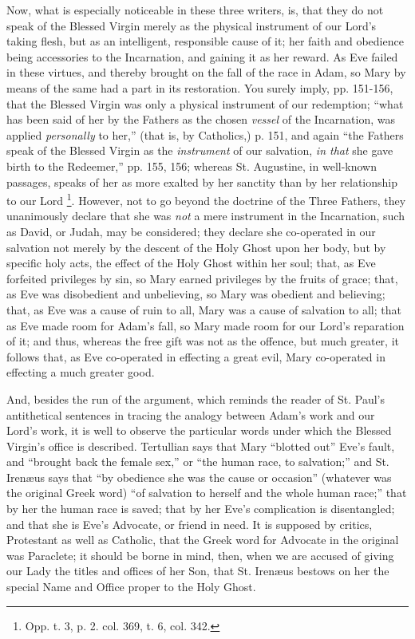 Now, what is especially noticeable in these three writers, is, that
they do not speak of the Blessed Virgin merely as the physical
instrument of our Lord's taking flesh, but as an intelligent,
responsible cause of it; her faith and obedience being accessories to
the Incarnation, and gaining it as her reward. As Eve failed in these
virtues, and thereby brought on the fall of the race in Adam, so Mary by
means of the same had a part in its restoration. You surely imply,
pp. 151-156, that the Blessed Virgin was only a physical instrument of
our redemption; ``what has been said of her by the Fathers as the
chosen \emph{vessel} of the Incarnation, was applied \emph{personally}
to her,'' (that is, by Catholics,) p. 151, and again ``the
Fathers speak of the Blessed Virgin as the \emph{instrument} of our
salvation, \emph{in that} she gave birth to the Redeemer,'' pp. 155,
156; whereas St. Augustine, in well-known passages, speaks of her as
more exalted by her sanctity than by her relationship to our Lord \footnote{Opp. t. 3, p. 2.
col. 369, t. 6, col. 342.}. However, not to go beyond the doctrine of the Three Fathers,
they unanimously declare that she was \emph{not} a mere instrument in
the Incarnation, such as David, or Judah, may be considered; they
declare she co-operated in our salvation not merely by the descent of the
Holy Ghost upon her body, but by specific holy acts, the effect of the
Holy Ghost within her soul; that, as Eve forfeited privileges by sin, so
Mary earned privileges by the fruits of grace; that, as Eve was
disobedient and unbelieving, so Mary was obedient and believing; that,
as Eve was a cause of ruin to all, Mary was a cause of salvation to all;
that as Eve made room for Adam's fall, so Mary made room for our Lord's
reparation of it; and thus, whereas the free gift was not as the
offence, but much greater, it follows that, as Eve co-operated in
effecting a great evil, Mary co-operated in effecting a much greater
good.

And, besides the run of the argument, which reminds the reader of St.
Paul's antithetical sentences in tracing the analogy between Adam's work
and our Lord's work, it is well to observe the particular words
under which the Blessed Virgin's office is described. Tertullian says
that Mary ``blotted out'' Eve's fault, and ``brought back
the female sex,'' or ``the human race, to salvation;'' and
St. Irenæus says that ``by obedience she was the cause or
occasion'' (whatever was the original Greek word) ``of salvation
to herself and the whole human race;'' that by her the human race is
saved; that by her Eve's complication is disentangled; and that she is
Eve's Advocate, or friend in need. It is supposed by critics, Protestant
as well as Catholic, that the Greek word for Advocate in the original
was Paraclete; it should be borne in mind, then, when we are accused of
giving our Lady the titles and offices of her Son, that St. Irenæus
bestows on her the special Name and Office proper to the Holy Ghost.

